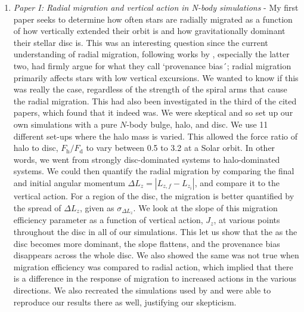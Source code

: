 \begin{enumerate}
    \item \textit{Paper I: Radial migration and vertical action in N-body simulations} - My first paper seeks to determine how often stars are radially migrated as a function of how vertically extended their orbit is and how gravitationally dominant their stellar disc is. This was an interesting question since the current understanding of radial migration, following works by \cite{solway:12, vera-ciro:14, vera-ciro:16b}, especially the latter two, had firmly argue for what they call `provenance bias´; radial migration primarily affects stars with low vertical excursions. We wanted to know if this was really the case, regardless of the strength of the spiral arms that cause the radial migration. This had also been investigated in the third of the cited papers, which found that it indeed was. We were skeptical and so set up our own simulations with a pure $N$-body bulge, halo, and disc. We use 11 different set-ups where the halo mass is varied. This allowed the force ratio of halo to disc, $F_\mathrm{h}/F_\mathrm{d}$ to vary between 0.5 to 3.2 at a Solar orbit. In other words, we went from strongly disc-dominated systems to halo-dominated systems. We could then quantify the radial migration by comparing the final and initial angular momentum $\Delta L_z = |L_{z,f} - L_{z_i}|$, and compare it to the vertical action. For a region of the disc, the migration is better quantified by the spread of $\Delta L_z$, given as $\sigma_{\Delta L_z}$. We look at the slope of this migration efficiency parameter as a function of vertical action, $J_z$, at various points throughout the disc in all of our simulations. This let us show that the as the disc becomes more dominant, the slope flattens, and the provenance bias disappears across the whole disc. We also showed the same was not true when migration efficiency was compared to radial action, which implied that there is a difference in the response of migration to increased actions in the various directions. We also recreated the simulations used by \cite{vera-ciro:16b} and were able to reproduce our results there as well, justifying our skepticism.
    

\end{enumerate}
